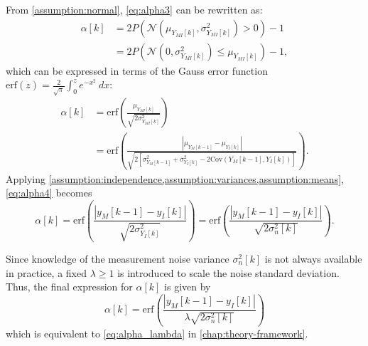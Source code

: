 From \cref{assumption:normal}, \cref{eq:alpha3} can be rewritten as:
%
\begin{align}
    \alpha[k] 
    &= 2 P(\mathcal{N}(\mu_{Y_{MI}[k]}, \sigma^2_{Y_{MI}[k]}) > 0) - 1 \nonumber\\
    &= 2 P(\mathcal{N}(0, \sigma^2_{Y_{MI}[k]}) \leq \mu_{Y_{MI}[k]}) - 1,
\end{align}
%
which can be expressed in terms of the Gauss error function
$\mathrm{erf}(z) = \frac{2}{\sqrt{\pi}} \int_0^z e^{-x^2} \ dx$:
%
\begin{align}
    \alpha[k] 
    &= \mathrm{erf}\left(\frac{\mu_{Y_{MI}[k]}}{\sqrt{2 \sigma^2_{Y_{MI}[k]}}}\right) \nonumber \\
    &= \mathrm{erf}\left(
        \frac{|\mu_{Y_M[k-1]} - \mu_{Y_I[k]}|}
             {\sqrt{2[\sigma^2_{Y_M[k-1]} + \sigma^2_{Y_I[k]} - 2 \mathrm{Cov}(Y_M[k-1], Y_I[k])]}}
        \right).
\label{eq:alpha4}
\end{align}
%
Applying \cref{assumption:independence,assumption:variances,assumption:means}, 
\cref{eq:alpha4} becomes
%
\begin{equation}
    \alpha[k] 
    = \mathrm{erf}\left(
        \frac{|y_M[k-1] - y_I[k]|}
             {\sqrt{2\sigma^2_{Y_I[k]}}}
        \right)
    = \mathrm{erf}\left(
        \frac{|y_M[k-1] - y_I[k]|}
             {\sqrt{2\sigma^2_n[k]}}
        \right).
\end{equation}

Since knowledge of the measurement noise variance $\sigma^2_n[k]$ is not always available in practice,
a fixed $\lambda \geq 1$ is introduced to scale the noise standard deviation.
Thus, the final expression for $\alpha[k]$ is given by
%
\begin{equation}
    \alpha[k] 
    = \mathrm{erf}\left(
        \frac{|y_M[k-1] - y_I[k]|}
             {\lambda\sqrt{2\sigma^2_n[k]}}
        \right)
\end{equation}
%
which is equivalent to \cref{eq:alpha_lambda} in \cref{chap:theory-framework}.